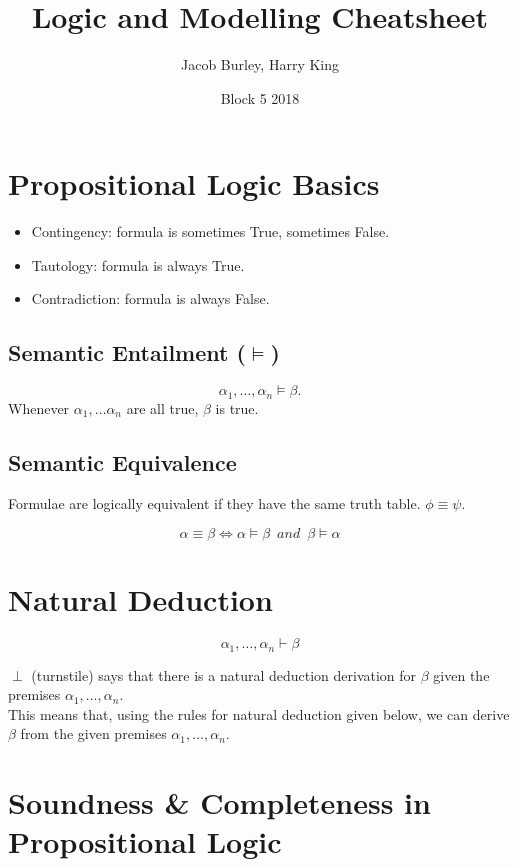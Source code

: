 \documentclass{article}
\title{Logic and Modelling Cheatsheet}
\author{Jacob Burley, Harry King}
\date{Block 5 2018}
\begin{document}
\maketitle

\section*{Propositional Logic Basics}
\begin{itemize}
    \item Contingency: formula is sometimes True, sometimes False.
    \item Tautology: formula is always True.
    \item Contradiction: formula is always False.
\end{itemize}

\subsection*{Semantic Entailment ($\vDash$)}

\[
\alpha_{1},\ldots,\alpha_{n}\vDash\beta.
\]
Whenever $\alpha_{1},\ldots\alpha_{n}$ are all true, $\beta$ is true.

\subsection*{Semantic Equivalence}

Formulae are logically equivalent if they have the same truth table.
$\phi\equiv\psi$.

\[
\alpha\equiv\beta\Longleftrightarrow\alpha\vDash\beta\,\,\,and\,\,\,\beta\vDash\alpha
\]

\section*{Natural Deduction}
$$\alpha_{1},\ldots,\alpha_{n}\vdash\beta$$

$\perp$ (turnstile) says that there is a natural deduction derivation
for $\beta$ given the premises $\alpha_{1},\ldots,\alpha_{n}$.
\\This means that, using the rules for natural deduction given below, we can derive $\beta$ from the given premises $\alpha_1,\ldots, \alpha_n$.

\section*{Soundness \& Completeness in Propositional Logic}
\end{document}
